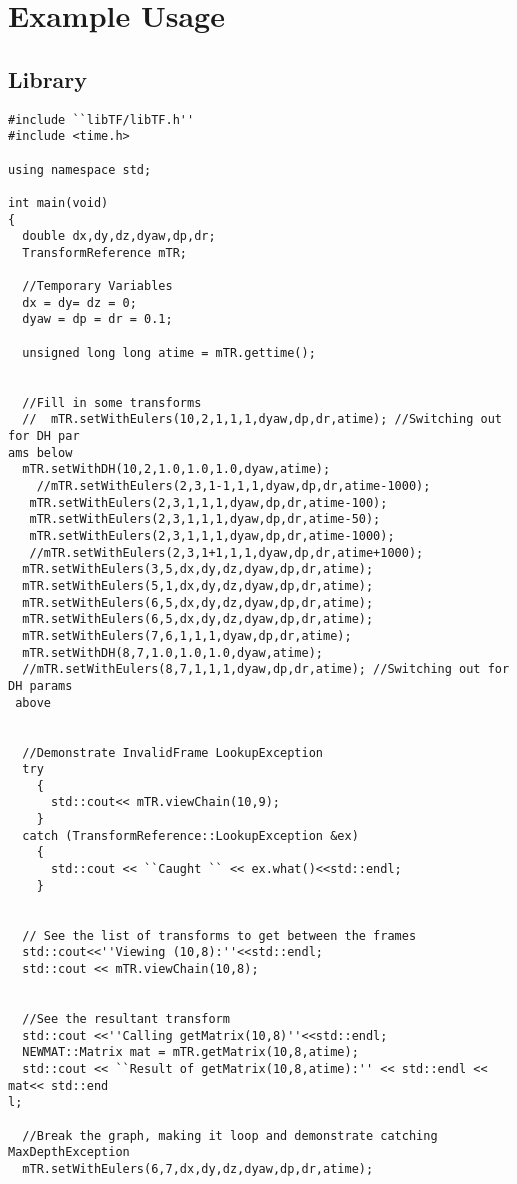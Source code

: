 \documentclass[12pt]{article}
\begin{document}
\section{Example Usage}
\subsection{Library}
\begin{verbatim}
#include ``libTF/libTF.h''
#include <time.h>

using namespace std;

int main(void)
{
  double dx,dy,dz,dyaw,dp,dr;
  TransformReference mTR;
  
  //Temporary Variables
  dx = dy= dz = 0;
  dyaw = dp = dr = 0.1;
  
  unsigned long long atime = mTR.gettime();

  
  //Fill in some transforms
  //  mTR.setWithEulers(10,2,1,1,1,dyaw,dp,dr,atime); //Switching out for DH par
ams below
  mTR.setWithDH(10,2,1.0,1.0,1.0,dyaw,atime);
    //mTR.setWithEulers(2,3,1-1,1,1,dyaw,dp,dr,atime-1000);
   mTR.setWithEulers(2,3,1,1,1,dyaw,dp,dr,atime-100);
   mTR.setWithEulers(2,3,1,1,1,dyaw,dp,dr,atime-50);
   mTR.setWithEulers(2,3,1,1,1,dyaw,dp,dr,atime-1000);
   //mTR.setWithEulers(2,3,1+1,1,1,dyaw,dp,dr,atime+1000);
  mTR.setWithEulers(3,5,dx,dy,dz,dyaw,dp,dr,atime);
  mTR.setWithEulers(5,1,dx,dy,dz,dyaw,dp,dr,atime);
  mTR.setWithEulers(6,5,dx,dy,dz,dyaw,dp,dr,atime);
  mTR.setWithEulers(6,5,dx,dy,dz,dyaw,dp,dr,atime);
  mTR.setWithEulers(7,6,1,1,1,dyaw,dp,dr,atime);
  mTR.setWithDH(8,7,1.0,1.0,1.0,dyaw,atime);
  //mTR.setWithEulers(8,7,1,1,1,dyaw,dp,dr,atime); //Switching out for DH params
 above
  
  
  //Demonstrate InvalidFrame LookupException
  try
    {
      std::cout<< mTR.viewChain(10,9);
    }
  catch (TransformReference::LookupException &ex)
    {
      std::cout << ``Caught `` << ex.what()<<std::endl;
    }
  
  
  // See the list of transforms to get between the frames
  std::cout<<''Viewing (10,8):''<<std::endl;  
  std::cout << mTR.viewChain(10,8);
  
  
  //See the resultant transform
  std::cout <<''Calling getMatrix(10,8)''<<std::endl;
  NEWMAT::Matrix mat = mTR.getMatrix(10,8,atime);  
  std::cout << ``Result of getMatrix(10,8,atime):'' << std::endl << mat<< std::end
l;
  
  //Break the graph, making it loop and demonstrate catching MaxDepthException
  mTR.setWithEulers(6,7,dx,dy,dz,dyaw,dp,dr,atime);
  

\end{verbatim}
\end{document}
